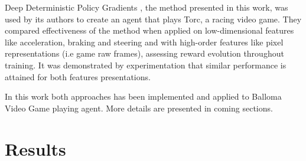 \documentclass[peerreview,onecolumn]{IEEEtran}
\begin{document}
	  Deep Deterministic Policy Gradients \cite{ddpg_2015}, the method presented in this work, was used by its authors to create an agent that plays Torc, a racing video game. They compared effectiveness of the method when applied on low-dimensional features like acceleration, braking and steering and with high-order features like pixel representations (i.e game raw frames), assessing reward evolution throughout training. It was demonstrated by experimentation that similar performance is attained for both features presentations.

	In this work both approaches has been implemented and applied to Balloma Video Game playing agent. More details are presented in coming sections.
	  
	  \section{Results}
	  
\end{document}
